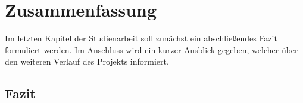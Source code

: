 \newpage
\section{Zusammenfassung}
Im letzten Kapitel der Studienarbeit soll zunächst ein abschließendes Fazit formuliert werden. Im Anschluss wird ein kurzer Ausblick gegeben, welcher über den weiteren Verlauf des Projekts informiert.

\subsection{Fazit}

